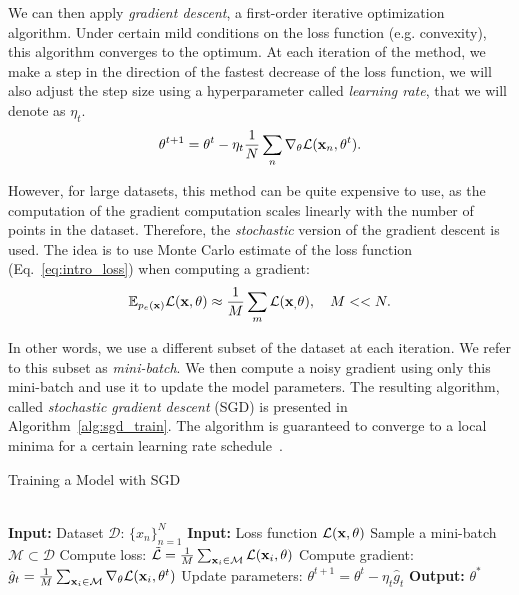 We can then apply \textit{gradient descent}, a first-order iterative optimization algorithm. Under certain mild conditions on the loss function (e.g. convexity), this algorithm converges to the optimum. At each iteration of the method, we make a step in the direction of the fastest decrease of the loss function, we will also adjust the step size using a hyperparameter called \textit{learning rate}, that we will denote as $\eta_t$.
\begin{equation}\label{eq:intro_gd}
    \theta^{t+1} = \theta^{t} - \eta_{t} \frac1N \sum_n \nabla_{\theta}\mathcal{L}(\rvx_n, \theta^{t}).
\end{equation}

However, for large datasets, this method can be quite expensive to use, as the computation of the gradient computation scales linearly with the number of points in the dataset. Therefore, the \textit{stochastic} version of the gradient descent is used. The idea is to use Monte Carlo estimate of the loss function (Eq.~\ref{eq:intro_loss}) when computing a gradient:
\begin{equation}
\mathbb{E}_{p_e({\mathbf{x}})} \mathcal{L}({\mathbf{x}}, \theta) \approx \frac1M \sum_m \mathcal{L}({\mathbf{x}}_, \theta), \quad M << N.
\end{equation}

In other words, we use a different subset of the dataset at each iteration. We refer to this subset as \textit{mini-batch}. We then compute a noisy gradient using only this mini-batch and use it to update the model parameters. The resulting algorithm, called \textit{stochastic gradient descent} (SGD) is presented in Algorithm~\ref{alg:sgd_train}. The algorithm is guaranteed to converge to a local minima for a certain learning rate schedule~\citep{robbins1951stochastic}.

\begin{algorithm}
	\caption{Training a Model with SGD}
	\label{alg:sgd_train}
	\begin{algorithmic}
  \\\hrulefill
\State \hskip-3mm  {\bfseries Input:} { Dataset $\mathcal{D}: \,\{x_n\}_{n=1}^N$}
\State \hskip-3mm  {\bfseries Input:} { Loss function $\mathcal{L}({\mathbf{x}}, \theta)$}
            \State Sample a mini-batch $\mathcal{M} \subset \mathcal{D}$
            \State Compute loss: $ \tilde{\mathcal{L}} = \frac1M \sum_{{\mathbf{x}}_i \in \mathcal{M}} \mathcal{L}({\mathbf{x}}_i, \theta)$
		\State Compute gradient: $\hat{g}_t = \frac1M \sum_{{\mathbf{x}}_i \in \mathcal{M}} \nabla_{\theta} \mathcal{L}({\mathbf{x}}_i, \theta^t)$
		\State Update parameters: $\theta^{t+1} = \theta^{t} - \eta_t \hat{g}_t $
		\EndWhile
            \State \hskip-3mm  {\bfseries Output:} $\theta^*$
	\end{algorithmic}
\end{algorithm}

